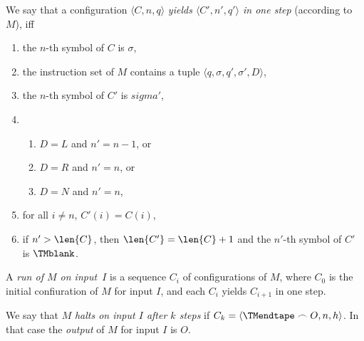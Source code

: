 \documentclass[../../include/open-logic-section]{subfiles}
\begin{document}
\begin{defn}
We say that a configuration $\langle C, n, q\rangle$ \emph{yields
  $\langle C', n', q'\rangle$ in one step} (according to $M$), iff
\begin{enumerate}
\item the $n$-th symbol of $C$ is $\sigma$,
\item the instruction set of $M$ contains a tuple $\langle q, \sigma,
  q', \sigma', D\rangle$, 
\item the $n$-th symbol of $C'$ is $sigma'$,
\item 
\begin{enumerate}
\item $D = L$ and $n' = n -1$, or
\item $D = R$ and $n' = n$, or
\item $D = N$ and $n' = n$, 
\end{enumerate}
\item for all $i \neq n$, $C'(i) = C(i)$,
\item if $n' > \len{C}$, then $\len{C'} = \len{C} + 1$ and the $n'$-th
  symbol of $C'$ is $\TMblank$.
\end{enumerate}
\end{defn}

\begin{defn}
A \emph{run of $M$ on input~$I$} is a sequence $C_i$ of configurations
of $M$, where $C_0$ is the initial confiuration of $M$ for input $I$,
and each $C_i$ yields $C_{i+1}$ in one step.  

We say that $M$ \emph{halts on input $I$ after $k$ steps} if $C_k =
\langle \TMendtape \frown O, n, h\rangle$. In that case the
\emph{output} of $M$ for input $I$ is $O$.
\end{defn}
\end{document}
